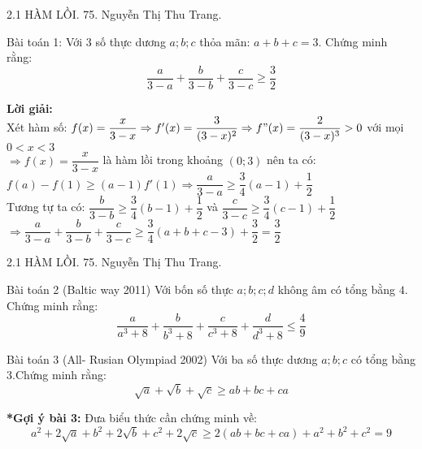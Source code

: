 \begin{frame}{2.1 HÀM LỒI. \hspace{6cm}  75. Nguyễn Thị Thu Trang.}
\begin{block}{Bài toán 1:}
Với $3$ số thực dương $a; b; c$ thỏa mãn: $a+b+c=3$. Chứng minh rằng:\\
$$\frac{a}{3-a}+\frac{b}{3-b}+\frac{c}{3-c}\ge \frac{3}{2}$$
\end{block}
\textbf{Lời giải:}\\
Xét hàm số: $f(x)= \dfrac{x}{3-x} \Rightarrow f'(x)=\dfrac{3}{(3-x)^2} \Rightarrow f"(x)= \dfrac{2}{(3-x)^3} > 0$ với mọi $0< x< 3$\\
$\Rightarrow f(x)=\dfrac{x}{3-x}$ là hàm lồi trong khoảng $(0; 3) $ nên ta có:\\
 $f(a)-f(1)\ge (a-1)f'(1) \Rightarrow \dfrac{a}{3-a}\ge \dfrac{3}{4}(a-1)+\dfrac{1}{2}$\\
 Tương tự ta có: $ \dfrac{b}{3-b}\ge \dfrac{3}{4}(b-1)+\dfrac{1}{2}$ và $\dfrac{c}{3-c}\ge \dfrac{3}{4}(c-1)+\dfrac{1}{2}$\\
 $\Rightarrow \dfrac{a}{3-a}+\dfrac{b}{3-b}+\dfrac{c}{3-c} \ge \dfrac{3}{4}(a+b+c-3)+\dfrac{3}{2 }=\dfrac{3}{2} $
\end{frame}
\begin{frame}{2.1 HÀM LỒI. \hspace{6cm}  75. Nguyễn Thị Thu Trang.}
\begin{block}{Bài toán 2 (Baltic way 2011)}
Với bốn số thực $a; b; c; d$ không âm có tổng bằng $4$. Chứng minh rằng:\\
$$\frac{a}{a^3+8}+\frac{b}{b^3+8}+\frac{c}{c^3+8}+\frac{d}{d^3+8} \leq \frac{4}{9}$$
\end{block}
\begin{block}{Bài toán 3 (All- Rusian Olympiad 2002)}
Với ba số thực dương $a; b; c$ có tổng bằng$3$.Chứng minh rằng:\\
$$\sqrt{a}+\sqrt{b}+\sqrt{c} \ge ab +bc +ca$$
\end{block}
\textbf{*Gợi ý bài 3:} Đưa biểu thức cần chứng minh về:\\
$$a^2 + 2\sqrt{a}+b^2 +2\sqrt{b}+ c^2 +2\sqrt{c} \ge 2(ab+bc+ca) + a^2 + b^2 +c^2= 9$$
\end{frame}
